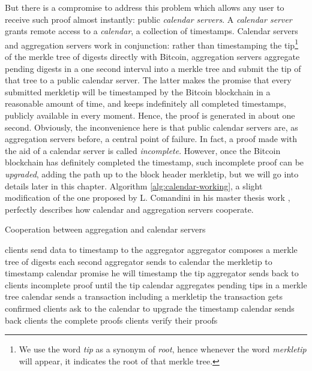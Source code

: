 \bigskip
\noindent
But there is a compromise to address this problem which allows any user to receive such proof almost instantly: public \textit{calendar servers}. A \textit{calendar server} grants remote access to a \textit{calendar}, a collection of timestamps. Calendar servers and aggregation servers work in conjunction: rather than timestamping the tip\footnote{We use the word \textit{tip} as a synonym of \textit{root}, hence whenever the word \textit{merkletip} will appear, it indicates the root of that merkle tree.} of the merkle tree of digests directly with Bitcoin, aggregation servers aggregate pending digests in a one second interval into a merkle tree and submit the tip of that tree to a public calendar server. The latter makes the promise that every submitted merkletip will be timestamped by the Bitcoin blockchain in a reasonable amount of time, and keeps indefinitely all completed timestamps, publicly available in every moment. Hence, the proof is generated in about one second. Obviously, the inconvenience here is that public calendar servers are, as aggregation servers before, a central point of failure. In fact, a proof made with the aid of a calendar server is called \textit{incomplete}. However, once the Bitcoin blockchain has definitely completed the timestamp, such incomplete proof can be \textit{upgraded}, adding the path up to the block header merkletip, but we will go into details later in this chapter. Algorithm \ref{alg:calendar-working}, a slight modification of the one proposed by L. Comandini in his master thesis work \cite{Comandini:Thesis:2018}, perfectly describes how calendar and aggregation servers cooperate.

\begin{algorithm}
	\caption{Cooperation between aggregation and calendar servers}
	\label{alg:calendar-working}
	\begin{algorithmic}[1]
		\State clients send data to timestamp to the aggregator\footnotemark {}
		\State aggregator composes a merkle tree of digests each second
		\State aggregator sends to calendar the merkletip to timestamp
		\State calendar promise he will timestamp the tip
		\State aggregator sends back to clients incomplete proof until the tip
		\State calendar aggregates pending tips in a merkle tree
		\State calendar sends a transaction including a merkletip
		\State the transaction gets confirmed 
		\State clients ask to the calendar to upgrade the timestamp
		\State calendar sends back clients the complete proofs
		\State clients verify their proofs
	\end{algorithmic}	
\end{algorithm}

